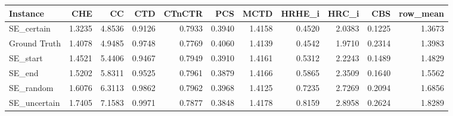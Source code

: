 \begin{tabular}{lrrrrrrrrrr}
\toprule
Instance & CHE & CC & CTD & CTnCTR & PCS & MCTD & HRHE_i & HRC_i & CBS & row_mean \\
\midrule
SE_certain & 1.3235 & 4.8536 & 0.9126 & 0.7933 & 0.3940 & 1.4158 & 0.4520 & 2.0383 & 0.1225 & 1.3673 \\
Ground Truth & 1.4078 & 4.9485 & 0.9748 & 0.7769 & 0.4060 & 1.4139 & 0.4542 & 1.9710 & 0.2314 & 1.3983 \\
SE_start & 1.4521 & 5.4406 & 0.9467 & 0.7949 & 0.3910 & 1.4161 & 0.5312 & 2.2243 & 0.1489 & 1.4829 \\
SE_end & 1.5202 & 5.8311 & 0.9525 & 0.7961 & 0.3879 & 1.4166 & 0.5865 & 2.3509 & 0.1640 & 1.5562 \\
SE_random & 1.6076 & 6.3113 & 0.9862 & 0.7962 & 0.3968 & 1.4125 & 0.7235 & 2.7269 & 0.2094 & 1.6856 \\
SE_uncertain & 1.7405 & 7.1583 & 0.9971 & 0.7877 & 0.3848 & 1.4178 & 0.8159 & 2.8958 & 0.2624 & 1.8289 \\
\bottomrule
\end{tabular}
